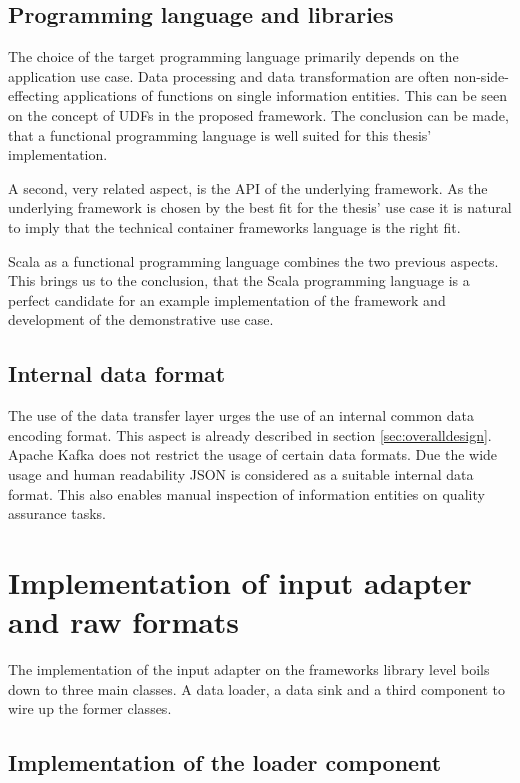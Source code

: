 \subsection{Programming language and libraries}
The choice of the target programming language primarily depends on the application use case. Data processing and data transformation are often non-side-effecting applications of functions on single information entities. This can be seen on the concept of UDFs in the proposed framework. The conclusion can be made, that a functional programming language is well suited for this thesis' implementation. 

A second, very related aspect, is the API of the underlying framework. As the underlying framework is chosen by the best fit for the thesis' use case it is natural to imply that the technical container frameworks language is the right fit. 

Scala as a functional programming language combines the two previous aspects. This brings us to the conclusion, that the Scala programming language is a perfect candidate for an example implementation of the framework and development of the demonstrative use case.

\subsection{Internal data format}
The use of the data transfer layer urges the use of an internal common data encoding format. This aspect is already described in section \ref{sec:overalldesign}. Apache Kafka does not restrict the usage of certain data formats. Due the wide usage and human readability JSON is considered as a suitable internal data format. This also enables manual inspection of information entities on quality assurance tasks. 

\section{Implementation of input adapter and raw formats}

The implementation of the input adapter on the frameworks library level boils down to three main classes. A data loader, a data sink and a third component to wire up the former classes. 

\subsection{Implementation of the loader component \label{ssec:loadercomponent}}


